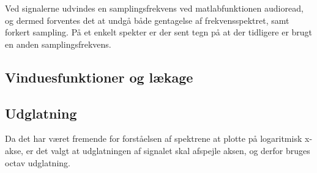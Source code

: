   Ved signalerne udvindes en samplingsfrekvens ved matlabfunktionen audioread, og dermed forventes det at undgå både gentagelse af frekvensspektret, samt forkert sampling. På et enkelt spekter er der sent tegn på at der tidligere er brugt en anden samplingsfrekvens.

\subsection{Vinduesfunktioner og lækage}

\subsection{Udglatning}

Da det har været fremende for forståelsen af spektrene at plotte på logaritmisk x-akse, er det valgt at udglatningen af signalet skal afspejle aksen, og derfor bruges octav udglatning.



